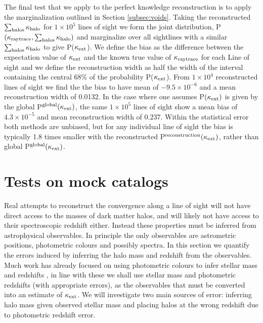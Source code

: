 \documentclass[useAMS,usenatbib]{mn2e}
\begin{document}
The final test that we apply to the perfect knowledge reconstruction is to apply the marginalization outlined in Section \ref{subsec:voids}. Taking the reconstructed $\sum_{\rm halos} \kappa_{\rm halo}$ for $1\times 10^{5}$ lines of sight we form the joint distribution, P$(\kappa_{\rm raytrace},\sum_{\rm halos} \kappa_{\rm halo})$ and marginalize over all sightlines with a similar $\sum_{\rm halos} \kappa_{\rm halo}$ to give P($\kappa_{\rm ext}$). We define the bias as the difference between the expectation value of $\kappa_{\rm ext}$ and the known true value of $\kappa_{\rm raytrace}$ for each Line of sight and we define the reconstruction width as half the width of the interval containing the central $68\%$ of the probability P($\kappa_{\rm ext}$). From $1\times 10^{4}$ reconstructed lines of sight we find the the bias to have mean of $-9.5\times 10^{-6}$ and a mean reconstruction width of 0.0132. In the case where one assumes P$(\kappa_{\rm ext})$ is given by the global P$^{\rm global}(\kappa_{\rm ext})$, the same $1\times 10^{5}$ lines of sight show a mean bias of $4.3\times 10^{-5}$ and mean reconstruction width of 0.237. Within the statistical error both methods are unbiased, but for any individual line of sight the bias is typically 1.8 times smaller with the reconstructed P$^{\rm reconstruction}(\kappa_{\rm ext})$, rather than global P$^{\rm global}(\kappa_{\rm ext})$. 


\section{Tests on mock catalogs}
\label{sec:obsMstar+z}

Real attempts to reconstruct the convergence along a line of sight will not have direct access to the masses of dark matter halos, 
and will likely not have access to their spectroscopic redshift either. Instead these properties must be inferred from astrophysical
observables. In principle the only observables are astrometric positions, photometric colours and possibly spectra. In this section we
quantify the errors induced by inferring the halo mass and redshift from the observables. Much work has already focused on using
photometric colours to infer stellar mass \citep[\eg][]{xxx} and redshifts \citep[\eg][]{BPZ}, in line with these we shall use
stellar mass and photometric redshifts (with appropriate errors), as the observables that must be converted into an estimate
of $\kappa_{\rm ext}$. We will investigate two main sources of error: inferring halo mass given observed stellar mass and placing halos at the wrong redshift due to photometric redshift error.
\end{document}

